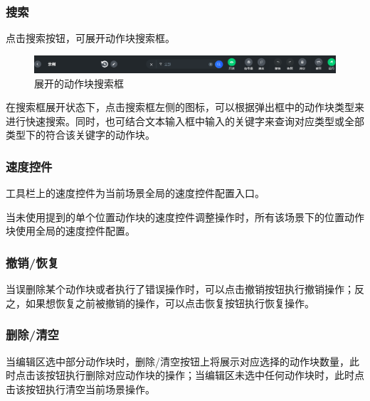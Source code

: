 \subsubsection{搜索}
点击搜索按钮，可展开动作块搜索框。

\begin{figure}[ht]
	\centering
	\includegraphics[width=\textwidth]{image/07/图3.15 展开的动作块搜索框.png}
	\caption{展开的动作块搜索框}
	\label{fig:展开的动作块搜索框}
\end{figure}

在搜索框展开状态下，点击搜索框左侧的图标，可以根据弹出框中的动作块类型来进行快速搜索。同时，也可结合文本输入框中输入的关键字来查询对应类型或全部类型下的符合该关键字的动作块。




\subsubsection{速度控件}
\label{sec:速度控件}
工具栏上的速度控件为当前场景全局的速度控件配置入口。

当未使用提到的单个位置动作块的速度控件调整操作时，所有该场景下的位置动作块使用全局的速度控件配置。


\subsubsection{撤销/恢复}
当误删除某个动作块或者执行了错误操作时，可以点击撤销按钮执行撤销操作；反之，如果想恢复之前被撤销的操作，可以点击恢复按钮执行恢复操作。




\subsubsection{删除/清空}
当编辑区选中部分动作块时，删除/清空按钮上将展示对应选择的动作块数量，此时点击该按钮执行删除对应动作块的操作；当编辑区未选中任何动作块时，此时点击该按钮执行清空当前场景操作。

